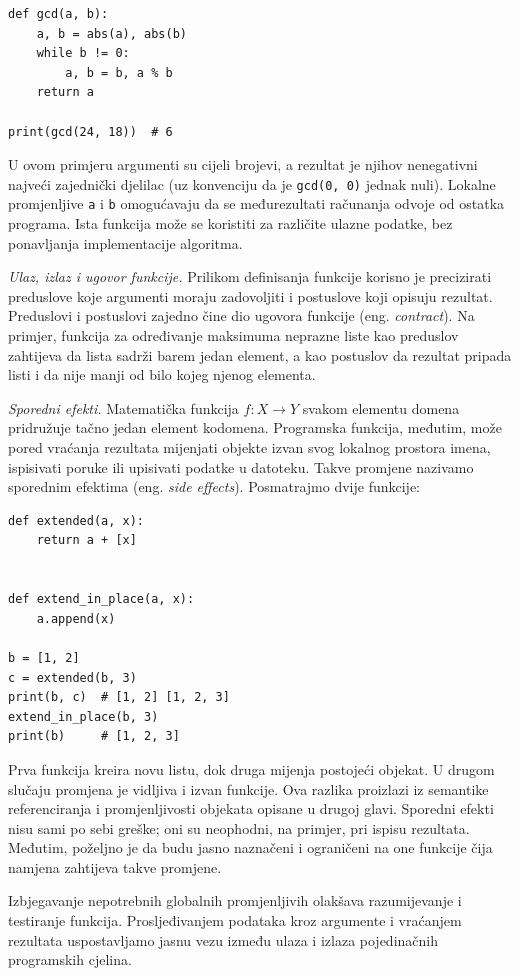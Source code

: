 \begin{verbatim}
def gcd(a, b):
    a, b = abs(a), abs(b)
    while b != 0:
        a, b = b, a % b
    return a

print(gcd(24, 18))  # 6
\end{verbatim}

U ovom primjeru argumenti su cijeli brojevi, a rezultat je njihov nenegativni najveći zajednički djelilac (uz konvenciju da je \texttt{gcd(0, 0)} jednak nuli). Lokalne promjenljive \texttt{a} i \texttt{b} omogućavaju da se međurezultati računanja odvoje od ostatka programa. Ista funkcija može se koristiti za različite ulazne podatke, bez ponavljanja implementacije algoritma.

\textit{Ulaz, izlaz i ugovor funkcije.} Prilikom definisanja funkcije korisno je precizirati preduslove koje argumenti moraju zadovoljiti i postuslove koji opisuju rezultat. Preduslovi i postuslovi zajedno čine dio ugovora funkcije (eng. \textit{contract}). Na primjer, funkcija za određivanje maksimuma neprazne liste kao preduslov zahtijeva da lista sadrži barem jedan element, a kao postuslov da rezultat pripada listi i da nije manji od bilo kojeg njenog elementa.

\textit{Sporedni efekti.} Matematička funkcija $f:X\to Y$ svakom elementu domena pridružuje tačno jedan element kodomena. Programska funkcija, međutim, može pored vraćanja rezultata mijenjati objekte izvan svog lokalnog prostora imena, ispisivati poruke ili upisivati podatke u datoteku. Takve promjene nazivamo sporednim efektima (eng. \textit{side effects}). Posmatrajmo dvije funkcije:

\begin{verbatim}
def extended(a, x):
    return a + [x]


def extend_in_place(a, x):
    a.append(x)

b = [1, 2]
c = extended(b, 3)
print(b, c)  # [1, 2] [1, 2, 3]
extend_in_place(b, 3)
print(b)     # [1, 2, 3]
\end{verbatim}

Prva funkcija kreira novu listu, dok druga mijenja postojeći objekat. U drugom slučaju promjena je vidljiva i izvan funkcije. Ova razlika proizlazi iz semantike referenciranja i promjenljivosti objekata opisane u drugoj glavi. Sporedni efekti nisu sami po sebi greške; oni su neophodni, na primjer, pri ispisu rezultata. Međutim, poželjno je da budu jasno naznačeni i ograničeni na one funkcije čija namjena zahtijeva takve promjene.

Izbjegavanje nepotrebnih globalnih promjenljivih olakšava razumijevanje i testiranje funkcija. Prosljeđivanjem podataka kroz argumente i vraćanjem rezultata uspostavljamo jasnu vezu između ulaza i izlaza pojedinačnih programskih cjelina.

